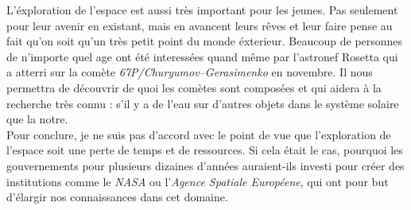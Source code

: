 \documentclass[12pt,a4paper]{article}
\begin{document}
L'éxploration de l'espace est aussi très important pour les jeunes.
Pas seulement pour leur avenir en existant, mais en avancent leurs
rêves et leur faire pense au fait qu'on soit qu'un très petit point du
monde éxterieur. Beaucoup de personnes de n'importe quel age ont été
interessées quand même par l'astronef Rosetta qui a atterri sur la
comète \textit{67P/Churyumov--Gerasimenko} en novembre. Il nous
permettra de découvrir de quoi les comètes sont composées et qui
aidera à la recherche très connu : s'il y a de l'eau sur d'autres
objets dans le système solaire que la notre.\\

Pour conclure, je ne suis pas d'accord avec le point de vue que
l'exploration de l'espace soit une perte de temps et de
ressources. Si cela était le cas, pourquoi les gouvernements pour
plusieurs dizaines d'années auraient-ils investi pour créer des
institutions comme le \textit{NASA} ou l'\textit{Agence Spatiale
Européene}, qui ont pour but d'élargir nos connaissances dans cet
domaine.
\end{document}
